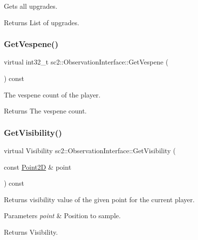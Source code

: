 Gets all upgrades. \begin{DoxyReturn}{Returns}
List of upgrades. 
\end{DoxyReturn}
\mbox{\label{classsc2_1_1_observation_interface_aa31de2f1b14a2306a282fef7314fbf37}} 
\subsubsection{\texorpdfstring{Get\+Vespene()}{GetVespene()}}
{\footnotesize\ttfamily virtual int32\+\_\+t sc2\+::\+Observation\+Interface\+::\+Get\+Vespene (\begin{DoxyParamCaption}{ }\end{DoxyParamCaption}) const\hspace{0.3cm}{\ttfamily [pure virtual]}}

The vespene count of the player. \begin{DoxyReturn}{Returns}
The vespene count. 
\end{DoxyReturn}
\mbox{\label{classsc2_1_1_observation_interface_ab17337d7e05f1e9cf80252da10f01b04}} 
\subsubsection{\texorpdfstring{Get\+Visibility()}{GetVisibility()}}
{\footnotesize\ttfamily virtual Visibility sc2\+::\+Observation\+Interface\+::\+Get\+Visibility (\begin{DoxyParamCaption}\item[{const \hyperlink{structsc2_1_1_point2_d}{Point2D} \&}]{point }\end{DoxyParamCaption}) const\hspace{0.3cm}{\ttfamily [pure virtual]}}

Returns visibility value of the given point for the current player. 
\begin{DoxyParams}{Parameters}
{\em point} & Position to sample. \\
\hline
\end{DoxyParams}
\begin{DoxyReturn}{Returns}
Visibility. 
\end{DoxyReturn}
\mbox{\label{classsc2_1_1_observation_interface_ade7028b262089975621a18c54d4cddb3}} 
